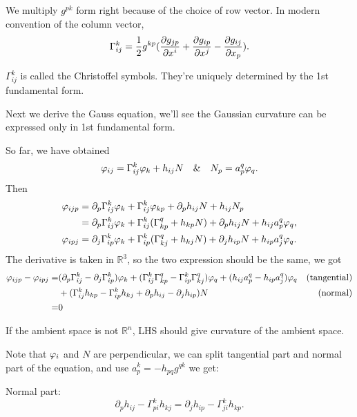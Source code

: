 \begin{remark}
    We multiply \(g^{pk}\) form right because of the choice of row vector. In
    modern convention of the column vector, \[
        \Gamma_{ij}^k=\frac{1}{2}g^{kp}(\pdv{g_{jp}}{x^i}+\pdv{g_{ip}}{x^j}
        -\pdv{g_{ij}}{x_{p}})
    .\] 
\end{remark}
\begin{definition}
    \(\Gamma_{ij}^k\) is called the Christoffel symbols. They're uniquely determined
    by the 1st fundamental form.
\end{definition}

Next we derive the Gauss equation, we'll see the Gaussian curvature can be
expressed only in 1st fundamental form.

So far, we have obtained \[
    \varphi_{ij}=\Gamma_{ij}^k\varphi_k+h_{ij}N
    \quad\&\quad
    N_p=a_p^q\varphi_q
.\] Then
\begin{align*}
    \varphi_{ijp}&= \partial_p \Gamma_{ij}^k\varphi_k+\Gamma_{ij}^k\varphi_{kp}+
    \partial_ph_{ij} N+h_{ij}N_p \\
    &= \partial_p\Gamma_{ij}^k\varphi_k+\Gamma_{ij}^k(\Gamma_{kp}^q+h_{kp}N)
    +\partial_p h_{ij} N+h_{ij}a_p^q \varphi_q, \\
    \varphi_{ipj}
    &= \partial_j\Gamma_{ip}^k\varphi_k+\Gamma_{ip}^k(\Gamma_{kj}^q+h_{kj}N)
    +\partial_j h_{ip} N+h_{ip}a_j^q \varphi_q
.\end{align*}
The derivative is taken in \(\mathbb{R}^3\), so the two expression should be
the same, we got 
\begin{align*}
    \varphi_{ijp}-\varphi_{ipj}
    =&(\partial_p\Gamma_{ij}^k-\partial_j\Gamma_{ip}^k)\varphi_k+(\Gamma_{ij}^k
    \Gamma_{kp}^q-\Gamma_{ip}^k\Gamma_{kj}^q)\varphi_q+(h_{ij}a_p^q-h_{ip}a_j^q)
    \varphi_q &\text{(tangential)} \\
    &+(\Gamma_{ij}^kh_{kp}-\Gamma_{ip}^kh_{kj}+\partial_p h_{ij}-\partial_{j}
    h_{ip})N &\text{(normal)} \\
    =& 0
\end{align*}
\begin{remark}
    If the ambient space is not \(\mathbb{R}^n\), LHS should give curvature of
    the ambient space.
\end{remark}

Note that \(\varphi_i\) and \(N\) are perpendicular, we can split tangential part
and normal part of the equation, and use \(a_{p}^k=-h_{pq}g^{qk}\) we get:

Normal part:
\begin{equation}\label{eq:codazzi}
    \partial_p h_{ij}-\Gamma_{pi}^kh_{kj}=\partial_j h_{ip}-\Gamma_{ji}^kh_{kp}
.\end{equation}

